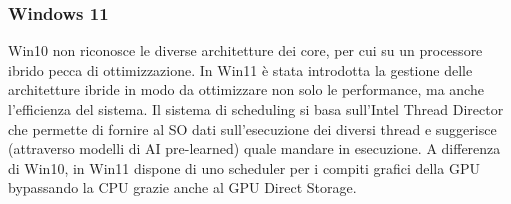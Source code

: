 \documentclass[a4paper]{article}
\begin{document}
\subsubsection*{Windows 11}
Win10 non riconosce le diverse architetture dei core, per cui su un processore ibrido pecca di ottimizzazione. In Win11
è stata introdotta la gestione delle architetture ibride in modo da ottimizzare non solo le performance, ma anche l'efficienza
del sistema. Il sistema di scheduling si basa sull'Intel Thread Director che permette di fornire al SO dati sull'esecuzione dei
diversi thread e suggerisce (attraverso modelli di AI pre-learned) quale mandare in esecuzione. A differenza di Win10, in Win11
dispone di uno scheduler per i compiti grafici della GPU bypassando la CPU grazie anche al GPU Direct Storage.

\newpage
\end{document}
